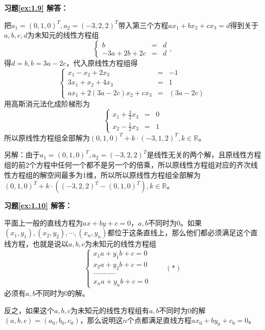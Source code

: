 \documentclass[a4paper]{book}
\begin{document}
\vspace{1.5em}

\textbf{习题\ref{ex:1.9} 解答：}

把$a_1 = (0,1,0)^T, a_2 = (-3,2,2)^T$带入第三个方程$ax_1 + bx_2 + cx_3 = d$得到关于$a,b,c,d$为未知元的线性方程组
$$\left\{ \begin{array}{rcl} b & = & d \\ -3a + 2b + 2c & = & d\end{array}\right.,$$
得$d = b, b = 3a - 2c$，代入原线性方程组得
$$\left\{ \begin{array}{rcl} x_1 - x_2 + 2x_3 & = & -1 \\ 3x_1 + x_2 + 4x_3 & = & 1 \\ ax_1 + 2(3a - 2c)x_2 + cx_3 & = & (3a - 2c)\end{array}\right.$$
用高斯消元法化成阶梯形为
$$\left\{ \begin{array}{rcl} x_1 + \frac32 x_3 & = & 0 \\ x_2 - \frac12 x_3 & = & 1 \end{array}\right.$$
所以原线性方程组全部解为$(0,1,0)^T + k\cdot(-3,1,2)^T, k\in\mathbb{R}$。

另解：由于$a_1 = (0,1,0)^T, a_2 = (-3,2,2)^T$是线性无关的两个解，且原线性方程组的前2个方程中任何一个都不是另一个的倍乘，所以原线性方程组对应的齐次线性方程组的解空间最多为1维，所以所以原线性方程组全部解为$(0,1,0)^T + k\cdot((-3,2,2)^T - (0,1,0)^T), k\in\mathbb{R}$。

\vspace{1.5em}

\textbf{习题\ref{ex:1.10} 解答：}

平面上一般的直线方程为$ax+by+c=0$，$a,b$不同时为0。如果$(x_1,y_1),(x_2,y_2),\cdots,(x_n,y_n)$都位于这条直线上，那么他们都必须满足这个直线方程，也就是说以$a,b,c$为未知元的线性方程组
$$\begin{cases} x_1a+y_1b+c = 0 \\ x_2a+y_2b+c = 0 \\ \cdots\cdots\cdots\cdots \\ x_na+y_nb+c = 0\end{cases} \qquad (\ast)$$
必须有$a,b$不同时为0的解。

反之，如果这个$a,b,c$为未知元的线性方程组有$a,b$不同时为0的解$(a,b,c) = (a_0,b_0,c_0)$，那么说明这$n$个点都满足直线方程$ax_0+by_0+c_0=0$。
\end{document}
